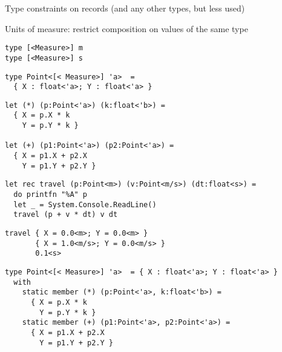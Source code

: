 \documentclass{beamer}
\begin{document}
\begin{slide}{
\item Type constraints on records (and any other types, but less used)
\item Units of measure: restrict composition on values of the same type
}\end{slide}

\begin{frame}[fragile]
\begin{lstlisting}
type [<Measure>] m
type [<Measure>] s
\end{lstlisting}
\end{frame}

\begin{frame}[fragile]
\begin{lstlisting}
type Point<[< Measure>] 'a>  = 
  { X : float<'a>; Y : float<'a> }
\end{lstlisting}
\end{frame}

\begin{frame}[fragile]
\begin{lstlisting}
let (*) (p:Point<'a>) (k:float<'b>) = 
  { X = p.X * k
    Y = p.Y * k }

let (+) (p1:Point<'a>) (p2:Point<'a>) = 
  { X = p1.X + p2.X
    Y = p1.Y + p2.Y }
\end{lstlisting}
\end{frame}

\begin{frame}[fragile]
\begin{lstlisting}
let rec travel (p:Point<m>) (v:Point<m/s>) (dt:float<s>) =
  do printfn "%A" p
  let _ = System.Console.ReadLine()
  travel (p + v * dt) v dt
\end{lstlisting}
\end{frame}

\begin{frame}[fragile]
\begin{lstlisting}
travel { X = 0.0<m>; Y = 0.0<m> }
       { X = 1.0<m/s>; Y = 0.0<m/s> } 
       0.1<s>
\end{lstlisting}
\end{frame}

\begin{frame}[fragile]
\begin{lstlisting}
type Point<[< Measure>] 'a>  = { X : float<'a>; Y : float<'a> }
  with
    static member (*) (p:Point<'a>, k:float<'b>) = 
      { X = p.X * k
        Y = p.Y * k }
    static member (+) (p1:Point<'a>, p2:Point<'a>) = 
      { X = p1.X + p2.X
        Y = p1.Y + p2.Y }

\end{lstlisting}
\end{frame}
\end{document}
